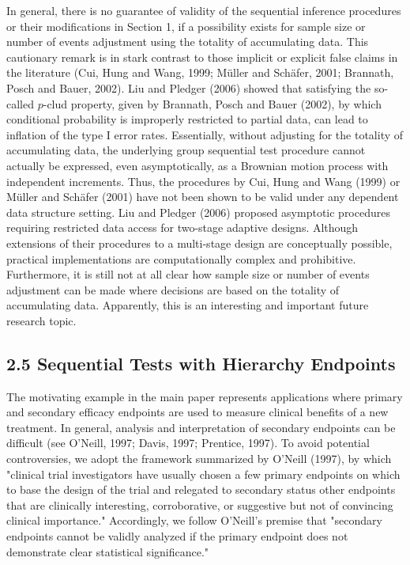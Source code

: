 \documentclass[10pt]{article}
\begin{document}
In general, there is no guarantee of validity of the sequential inference procedures or their modifications in Section 1, if a possibility exists for sample size or number of events adjustment using the totality of accumulating data. This cautionary remark is in stark contrast to those implicit or explicit false claims in the literature (Cui, Hung and Wang, 1999; Müller and Schäfer, 2001; Brannath, Posch and Bauer, 2002). Liu and Pledger (2006) showed that satisfying the so-called $p$-clud property, given by Brannath, Posch and Bauer (2002), by which conditional probability is improperly restricted to partial data, can lead to inflation of the type I error rates. Essentially, without adjusting for the totality of accumulating data, the underlying group sequential test procedure cannot actually be expressed, even asymptotically, as a Brownian motion process with independent increments. Thus, the procedures by Cui, Hung and Wang (1999) or Müller and Schäfer (2001) have not been shown to be valid under any dependent data structure setting. Liu and Pledger (2006) proposed asymptotic procedures requiring restricted data access for two-stage adaptive designs. Although extensions of their procedures to a multi-stage design are conceptually possible, practical implementations are computationally complex and prohibitive. Furthermore, it is still not at all clear how sample size or number of events adjustment can be made where decisions are based on the totality of accumulating data. Apparently, this is an interesting and important future research topic.

\subsection*{2.5 Sequential Tests with Hierarchy Endpoints}
The motivating example in the main paper represents applications where primary and secondary efficacy endpoints are used to measure clinical benefits of a new treatment. In general, analysis and interpretation of secondary endpoints can be difficult (see O'Neill, 1997; Davis, 1997; Prentice, 1997). To avoid potential controversies, we adopt the framework summarized by O'Neill (1997), by which "clinical trial investigators have usually chosen a few primary endpoints on which to base the design of the trial and relegated to secondary status other endpoints that are clinically interesting, corroborative, or suggestive but not of convincing clinical importance." Accordingly, we follow O'Neill's premise that "secondary endpoints cannot be validly analyzed if the primary endpoint does not demonstrate clear statistical significance."
\end{document}
